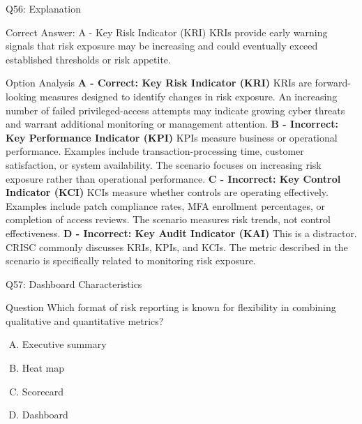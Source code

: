 \documentclass{beamer}
\begin{document}
	
	 \begin{frame}[shrink=10]{Q56: Explanation} \footnotesize \begin{block}{Correct Answer: A - Key Risk Indicator (KRI)} KRIs provide early warning signals that risk exposure may be increasing and could eventually exceed established thresholds or risk appetite. \end{block} \begin{block}{Option Analysis} \textbf{A - Correct: Key Risk Indicator (KRI)} KRIs are forward-looking measures designed to identify changes in risk exposure. An increasing number of failed privileged-access attempts may indicate growing cyber threats and warrant additional monitoring or management attention. \vspace{0.15cm} \textbf{B - Incorrect: Key Performance Indicator (KPI)} KPIs measure business or operational performance. Examples include transaction-processing time, customer satisfaction, or system availability. The scenario focuses on increasing risk exposure rather than operational performance. \vspace{0.15cm} \textbf{C - Incorrect: Key Control Indicator (KCI)} KCIs measure whether controls are operating effectively. Examples include patch compliance rates, MFA enrollment percentages, or completion of access reviews. The scenario measures risk trends, not control effectiveness. \vspace{0.15cm} \textbf{D - Incorrect: Key Audit Indicator (KAI)} This is a distractor. CRISC commonly discusses KRIs, KPIs, and KCIs. The metric described in the scenario is specifically related to monitoring risk exposure. \end{block}  \end{frame}
	
	\begin{frame}{Q57: Dashboard Characteristics}
		\begin{block}{Question}
			Which format of risk reporting is known for flexibility in combining qualitative and quantitative metrics?
		\end{block}
		\begin{enumerate}[(A)]
			\item Executive summary
			\item Heat map
			\item Scorecard
			\item Dashboard
		\end{enumerate}
	\end{frame}
	
\end{document}
